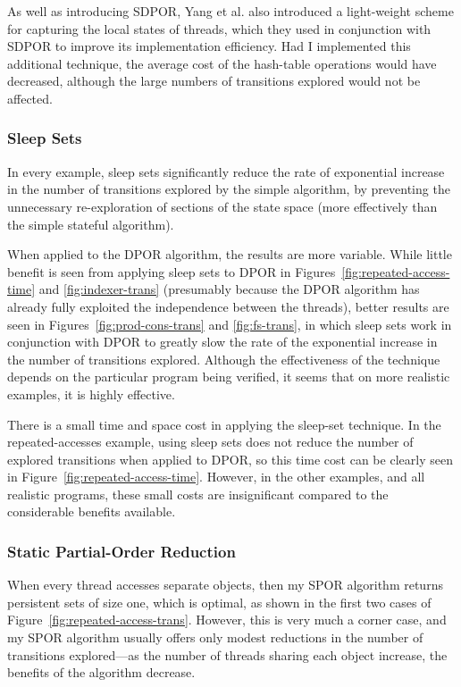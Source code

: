 \documentclass[12pt,a4paper,twoside,openright]{report}
\begin{document}
As well as introducing SDPOR, Yang et al.\@
also introduced a light-weight
scheme for capturing the local states of
threads, which they used in conjunction with
SDPOR to improve its implementation efficiency.
Had I implemented this additional
technique, the average cost of the hash-table
operations would have decreased, although
the large numbers of transitions explored
would not be affected.

\subsubsection{Sleep Sets}
In every example,
sleep sets significantly reduce the
rate of exponential increase in
the number of transitions explored by the
simple algorithm, by preventing the
unnecessary re-exploration of sections
of the state space (more effectively
than the simple stateful algorithm).

When applied to the DPOR algorithm, the results
are more variable. While little benefit is seen
from applying sleep sets to DPOR in
Figures~\ref{fig:repeated-access-time}
and \ref{fig:indexer-trans}
(presumably because the DPOR algorithm has already
fully exploited the independence between the threads),
better results are seen in 
Figures~\ref{fig:prod-cons-trans} and \ref{fig:fs-trans},
in which sleep sets work
in conjunction with DPOR to greatly
slow the rate of the exponential increase in the
number of transitions explored.
Although the effectiveness of the technique
depends on the particular program being
verified, it seems that on more realistic
examples, it is highly effective.

There is a small time and space cost in
applying the sleep-set technique.
In the repeated-accesses example,
using sleep sets does not reduce the number
of explored transitions when applied
to DPOR, so this time cost can be clearly
seen in Figure~\ref{fig:repeated-access-time}.
However, in the other examples, and all
realistic programs, these
small costs are insignificant compared
to the considerable benefits available.

\subsubsection{Static Partial-Order Reduction}
When every thread accesses separate objects,
then my SPOR algorithm returns persistent sets
of size one, which is optimal, as shown in the
first two cases of
Figure~\ref{fig:repeated-access-trans}.
However, this is very much a corner case,
and my SPOR algorithm usually offers only
modest reductions in the number of transitions
explored---as the number of threads sharing
each object increase, the benefits of the
algorithm decrease.
\end{document}
